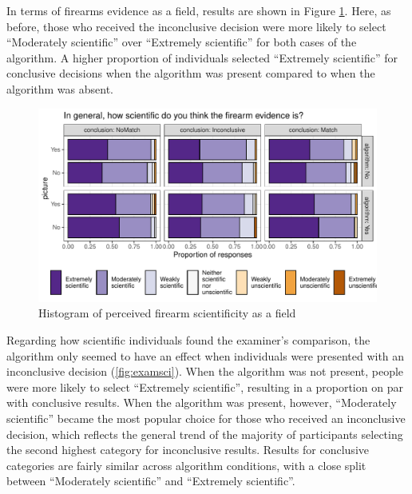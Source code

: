 \documentclass[print]{nuthesis}
\begin{document}
In terms of firearms evidence as a field, results are shown in Figure \ref{fig:gensci}.
Here, as before, those who received the inconclusive decision were more likely to select ``Moderately scientific'' over ``Extremely scientific'' for both cases of the algorithm.
A higher proportion of individuals selected ``Extremely scientific'' for conclusive decisions when the algorithm was present compared to when the algorithm was absent.

\begin{figure}

{\centering \includegraphics[width=\linewidth]{thesis_files/figure-latex/gensci-1} 

}

\caption{Histogram of perceived firearm scientificity as a field}\label{fig:gensci}
\end{figure}

Regarding how scientific individuals found the examiner's comparison, the algorithm only seemed to have an effect when individuals were presented with an inconclusive decision (\ref{fig:examsci}).
When the algorithm was not present, people were more likely to select ``Extremely scientific'', resulting in a proportion on par with conclusive results.
When the algorithm was present, however, ``Moderately scientific'' became the most popular choice for those who received an inconclusive decision, which reflects the general trend of the majority of participants selecting the second highest category for inconclusive results.
Results for conclusive categories are fairly similar across algorithm conditions, with a close split between ``Moderately scientific'' and ``Extremely scientific''.
\end{document}
